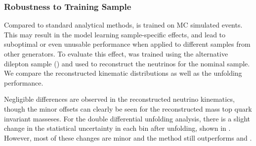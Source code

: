 \subsubsection{Robustness to Training Sample}

Compared to standard analytical methods, \vflows is trained on MC simulated events.
This may result in the model learning sample-specific effects, and lead to suboptimal or even unusable performance when applied to different samples from other generators.
To evaluate this effect, \vvflows was trained using the alternative \ttbar dilepton sample (\vvflowsPy) and used to reconstruct the neutrinos for the nominal \ttbar sample.
We compare the reconstructed kinematic distributions as well as the unfolding performance.

Negligible differences are observed in the reconstructed neutrino kinematics, though the minor offsets can clearly be seen for the reconstructed \Wboson mass top quark invariant masseses.
For the double differential unfolding analysis, there is a slight change in the statistical uncertainty in each bin after unfolding, shown in .
However, most of these changes are minor and the method still outperforms \vweight and \ellipse.

